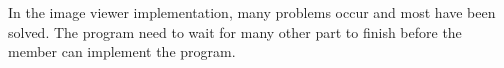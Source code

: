 In the image viewer implementation, many problems occur and most have been solved.
The program need to wait for many other part to finish before the member can implement the program. 